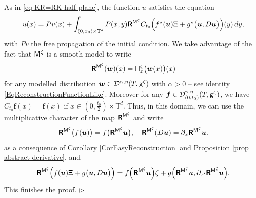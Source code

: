 \documentclass[10pt, reqno]{amsart}
\numberwithin{subsection}{section}
\numberwithin{subsubsection}{subsection}
\numberwithin{equation}{section} %
\newenvironment{Dem}[1][\unskip]{%
    \begin{list}{\hspace{1.15cm}{\sf \textbf{{\small Proof #1 --}}}}{%
        \setlength{\topsep}{0pt}%
        \setlength{\leftmargin}{0pt}%
        \setlength{\rightmargin}{0pt}%
        \setlength{\listparindent}{0pt}%
        \setlength{\itemindent}{0pt}%
        \setlength{\parsep}{0pt}%
        \addtolength{\leftmargin}{0pt}%
        \addtolength{\rightmargin}{0pt}%
    } \item }{\hfill $\rhd$\end{list}\smallskip}
\theoremstyle{mystyle}
\theoremstyle{mystyle2}
\theoremstyle{mystyle3}
\newcommand{\bsf}{\boldsymbol{f}}
\newcommand{\bsu}{\boldsymbol{u}}
\newcommand{\bsw}{\boldsymbol{w}}
\newcommand{\bbT}{\mathbb{T}}
\newcommand{\mcD}{\mathcal{D}}
\begin{document}
\begin{Dem}
As in \eqref{eq KR=RK half plane}, the function $u$ satisfies the equation
\begin{align*}
u(x) = Pv(x)+\int_{(0,x_0)\times\bbT^d}P(x,y) \textbf{\textsf{R}}^{{\sf 
M}^\zeta} C_{t_0}\Big(f^\star(\bsu)\Xi + g^\star\big(\bsu,D\bsu\big)\Big) (y)\,dy,
\end{align*}
with $Pv$ the free propagation of the initial condition. We take advantage of the fact that ${\sf M}^\zeta$ is  a smooth model to write
$$
\textbf{\textsf{R}}^{{\sf M}^\zeta}(\bsw) (x) = {\sf \Pi}_x^\zeta\big(\bsw(x)\big)(x)
$$
for any modelled distribution $\bsw\in\mcD^{\alpha,\eta}(T,{\sf g}^\zeta)$ with $\alpha>0$ -- see identity \eqref{EqReconstructionFunctionLike}. Moreover for any $\bsf\in\mcD_{(0,t_0)}^{\gamma.\eta}(T,{\sf g}^\zeta)$, we have $C_{t_0}\bsf(x)=\bsf(x)$ if $x\in(0,\frac{t_0}2)\times\bbT^d$. Thus, in this domain, we can use the multiplicative character of the map $\textbf{\textsf{R}}^{{\sf M}^\zeta}$ and write 
$$
\textbf{\textsf{R}}^{{\sf M}^\zeta}\big(f(\bsu)\big) = f\big(\textbf{\textsf{R}}^{{\sf M}^\zeta}\bsu\big),\quad
\textbf{\textsf{R}}^{{\sf M}^\zeta}( D\bsu  ) = \partial_x\textbf{\textsf{R}}^{{\sf M}^\zeta}\bsu.
$$
as a consequence of Corollary \ref{CorEasyReconstruction} and Proposition \ref{prop abstract derivative}, and
\begin{align*}
\textbf{\textsf{R}}^{{\sf M}^\zeta}
\Big(f(\bsu)\Xi + g\big(\bsu, D\bsu  \big)\Big)
= f\Big(\textbf{\textsf{R}}^{{\sf M}^\zeta}\bsu\Big)\zeta
+g\Big(\textbf{\textsf{R}}^{{\sf M}^\zeta}\bsu,\partial_{x'}\textbf{\textsf{R}}^{{\sf M}^\zeta}\bsu\Big).
\end{align*}   
This finishes the proof.
\end{Dem}

\medskip
\end{document}
